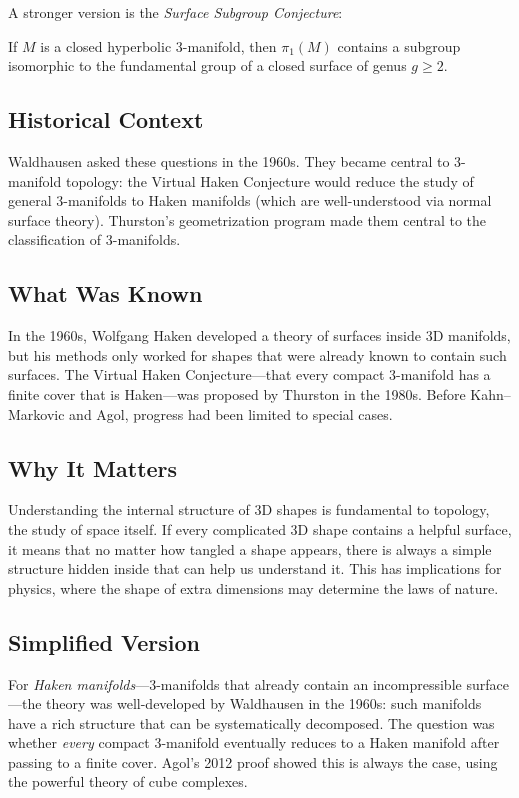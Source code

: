 A stronger version is the \emph{Surface Subgroup Conjecture}:

\begin{conjecture}
If $M$ is a closed hyperbolic 3-manifold, then $\pi_1(M)$ contains a subgroup isomorphic to the fundamental group of a closed surface of genus $g \ge 2$.
\end{conjecture}

\subsection{Historical Context}
Waldhausen asked these questions in the 1960s. They became central to 3-manifold topology: the Virtual Haken Conjecture would reduce the study of general 3-manifolds to Haken manifolds (which are well-understood via normal surface theory). Thurston's geometrization program made them central to the classification of 3-manifolds.

\subsection{What Was Known}
In the 1960s, Wolfgang Haken developed a theory of surfaces inside 3D manifolds, but his methods only worked for shapes that were already known to contain such surfaces. The Virtual Haken Conjecture---that every compact 3-manifold has a finite cover that is Haken---was proposed by Thurston in the 1980s. Before Kahn--Markovic and Agol, progress had been limited to special cases.

\subsection{Why It Matters}
Understanding the internal structure of 3D shapes is fundamental to topology, the study of space itself. If every complicated 3D shape contains a helpful surface, it means that no matter how tangled a shape appears, there is always a simple structure hidden inside that can help us understand it. This has implications for physics, where the shape of extra dimensions may determine the laws of nature.

\subsection{Simplified Version}
For \emph{Haken manifolds}---3-manifolds that already contain an incompressible surface---the theory was well-developed by Waldhausen in the 1960s: such manifolds have a rich structure that can be systematically decomposed. The question was whether \emph{every} compact 3-manifold eventually reduces to a Haken manifold after passing to a finite cover. Agol's 2012 proof showed this is always the case, using the powerful theory of cube complexes.

